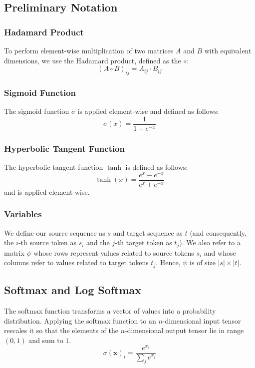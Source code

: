 \documentclass[twoside,twocolumn]{article}
\renewcommand{\vec}[1]{\mathbf{#1}}
\begin{document}
\subsection{Preliminary Notation}

\subsubsection{Hadamard Product}

To perform element-wise multiplication of two matrices $A$ and $B$ with
equivalent dimensions, we use the Hadamard product, defined as the $\circ$:
\begin{equation}
  (A \circ B)_{ij} = A_{ij} \cdot B_{ij}
\end{equation}

\subsubsection{Sigmoid Function}

The sigmoid function $\sigma$ is applied element-wise and defined as follows:
\begin{equation}
  \sigma(x) = \frac{1}{1+e^{-x}}
\end{equation}

\subsubsection{Hyperbolic Tangent Function}

The hyperbolic tangent function $\tanh$ is defined as follows:
\begin{equation}
  \tanh(x) = \frac{e^x - e^{-x}} {e^x + e^{-x}}
\end{equation}
and is applied element-wise.

\subsubsection{Variables}
We define our source sequence as $s$ and target sequence as $t$ (and
consequently, the $i$-th source token as $s_i$ and the $j$-th target token as
$t_j$).
We also refer to a matrix $\psi$ whose rows represent values related to source
tokens $s_i$ and whose columns refer to values related to target tokens $t_j$.
Hence, $\psi$ is of size $|s| \times |t|$.

\subsection{Softmax and Log Softmax}
The softmax function transforms a vector of values into a probability
distribution. Applying the softmax function to an $n$-dimensional input tensor
rescales it so that the elements of the $n$-dimensional output tensor lie in
range $(0,1)$ and sum to $1$.
\begin{equation}
  \sigma(\vec{x})_i = \frac{e^{x_i}}{\sum_j e^{x_j}}
\end{equation}
\end{document}
